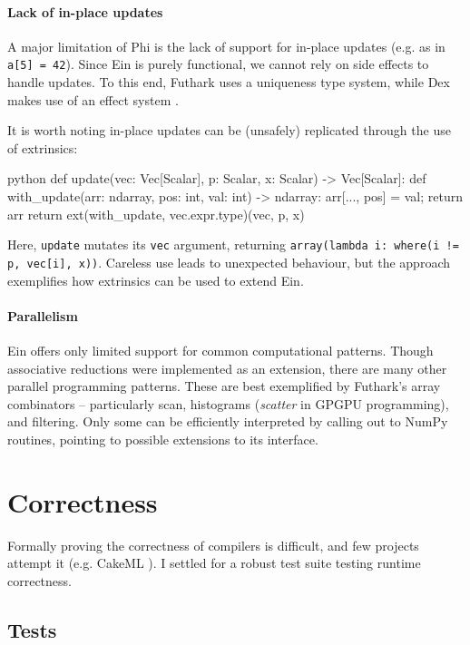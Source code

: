 \paragraph{Lack of in-place updates} A major limitation of Phi is the lack of support for in-place updates (e.g. as in \texttt{a[5] = 42}). 
Since Ein is purely functional, we cannot rely on side effects to handle updates.
To this end, Futhark uses a uniqueness type system, while Dex makes use of an effect system \cite{henriksen2017futhark, paszke2021getting}. 

It is worth noting in-place updates can be (unsafely) replicated through the use of extrinsics: 
\begin{center}    
\begin{cminted}{python}
def update(vec: Vec[Scalar], p: Scalar, x: Scalar) -> Vec[Scalar]:
    def with_update(arr: ndarray, pos: int, val: int) -> ndarray:
        arr[..., pos] = val; return arr
    return ext(with_update, vec.expr.type)(vec, p, x)    
\end{cminted}
\end{center}
Here, \texttt{update} mutates its \texttt{vec} argument, returning \texttt{array(lambda i: where(i != p, vec[i], x))}. Careless use leads to unexpected behaviour, but the approach exemplifies how extrinsics can be used to extend Ein.


\paragraph{Parallelism} Ein offers only limited support for common computational patterns. Though associative reductions were implemented as an extension, there are many other parallel programming patterns. These are best exemplified by Futhark's array combinators -- particularly scan, histograms (\textit{scatter} in GPGPU programming), and filtering. Only some can be efficiently interpreted by calling out to NumPy routines, pointing to possible extensions to its interface.

\section{Correctness}

Formally proving the correctness of compilers is difficult, and few projects attempt it (e.g. CakeML \cite{kumar2014cakeml}). 
I settled for a robust test suite testing runtime correctness.

\subsection{Tests}

